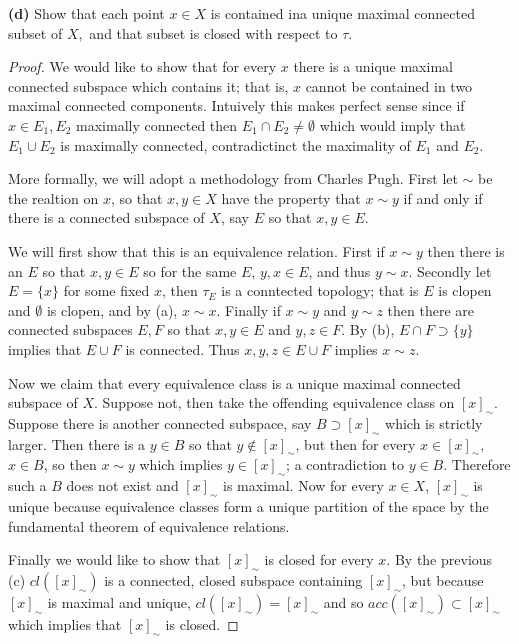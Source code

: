 \documentclass[11pt]{amsart}
\theoremstyle{definition}
\numberwithin{theorem}{section}
\numberwithin{definition}{section}
\numberwithin{equation}{section}
\begin{document}
\noindent \textbf{(d)} Show that each point $x \in X$ is contained ina unique maximal connected subset of $X,$ and that subset is closed with respect to $\tau$.
\begin{proof}
	We would like to show that for every $x$ there is a unique maximal connected subspace which contains it; that is, $x$ cannot be contained in two maximal connected components. Intuively this makes perfect sense since if $x \in E_1, E_2$ maximally connected then $E_1 \cap E_2 \neq \emptyset$ which would imply that $E_1 \cup E_2$ is maximally connected, contradictinct the maximality of $E_1$ and $E_2$.

	More formally, we will adopt a methodology from Charles Pugh. First let $\sim$ be the realtion on $x$, so that $x, y \in X$ have the property that $x \sim y$ if and only if there is a connected subspace of $X$, say $E$ so that $x, y \in E.$ 

	We will first show that this is an equivalence relation. First if $x \sim y$ then there is an $E$ so that $x ,y \in E$ so for the same $E$, $y, x \in E$, and thus $y \sim x$. Secondly let $E= \{x\}$ for some fixed $x$, then $\tau_E$ is a conntected topology; that is $E$ is clopen and $\emptyset$ is clopen, and by (a), $x\sim x$.  Finally if $x \sim y$ and $y \sim z$ then there are connected subspaces $E, F$ so that $x,y \in E$ and $y,z \in F$. By (b), $E \cap F \supset \{y\}$ implies that $E \cup F$ is connected. Thus $x,y, z \in E \cup F$ implies $x \sim z$.

	Now we claim that every equivalence class is a unique maximal connected subspace of $X$. Suppose not, then take the offending equivalence class on $[x]_\sim$. Suppose there is another connected subspace, say $B \supset [x]_\sim$ which is strictly larger. Then there is a $y \in B$ so that $y \notin [x]_\sim$, but then for every $x \in [x]_\sim,$ $x \in B$, so then $x \sim y$ which implies $y \in [x]_\sim$; a contradiction to $y \in B$. Therefore such a $B$ does not exist and $[x]_\sim$ is maximal. Now for every $x \in X$, $[x]_\sim$
	is unique because equivalence classes form a unique partition of the space by the  fundamental theorem of equivalence relations.

	Finally we would like to show that $[x]_\sim$ is closed for every $x.$ By the previous (c) $cl([x]_\sim)$ is a connected, closed subspace containing $[x]_\sim$, but because $[x]_\sim$ is maximal and unique, $cl([x]_\sim) =[x]_\sim$ and so $acc([x]_\sim) \subset [x]_\sim$ which implies that $[x]_\sim$ is closed.

\end{proof}
\end{document}
